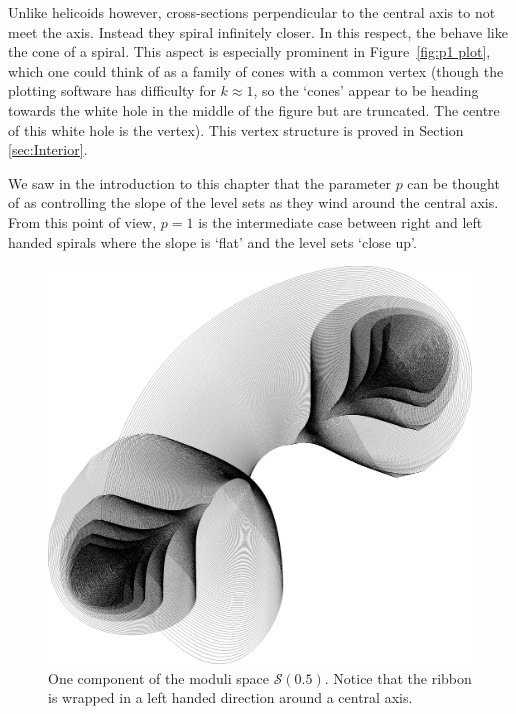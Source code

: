 \documentclass{article}
\begin{document}
Unlike helicoids however, cross-sections perpendicular to the central axis to not meet the axis. Instead they spiral infinitely closer. In this respect, the behave like the cone of a spiral. This aspect is especially prominent in Figure~\ref{fig:p1 plot}, which one could think of as a family of cones with a common vertex (though the plotting software has difficulty for $k\approx 1$, so the `cones' appear to be heading towards the white hole in the middle of the figure but are truncated. The centre of this white hole is the vertex). This vertex structure is proved in Section \ref{sec:Interior}.

We saw in the introduction to this chapter that the parameter $p$ can be thought of as controlling the slope of the level sets as they wind around the central axis. From this point of view, $p=1$ is the intermediate case between right and left handed spirals where the slope is `flat' and the level sets `close up'.

\begin{figure}
    \includegraphics[width=\textwidth]{graphics/moduli_plot_p05.png}
    \caption{One component of the moduli space $\mathcal{S}(0.5)$. Notice that the ribbon is wrapped in a left handed direction around a central axis.}
    \label{fig:p05 plot}
\end{figure}
\end{document}
